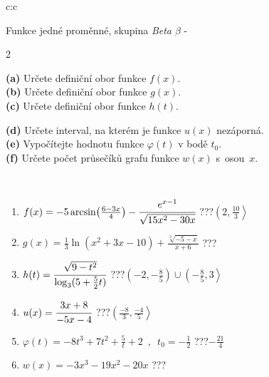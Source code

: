 \documentclass[10pt]{report}
\begin{document}
\begin{tabular}{c:c}
\begin{minipage}[c][104.5mm][t]{0.5\linewidth}
\begin{center}
\vspace{7mm}
{\huge Funkce jedné proměnné, skupina \textit{Beta $\beta$} -}\\[5mm]
\begin{minipage}{0.95\linewidth}
\begin{center}
{\small \begin{multicols}{2} \raggedright
\textbf{(a)} Určete definiční obor funkce \(f(x)\). \\[1mm]
\textbf{(b)} Určete definiční obor funkce \(g(x)\). \\[1mm]
\textbf{(c)} Určete definiční obor funkce \(h(t)\). \par \columnbreak
\textbf{(d)} Určete interval, na kterém je funkce \(u(x)\) nezáporná. \\[1mm]
\textbf{(e)} Vypočítejte hodnotu funkce \(\varphi(t)\) v bodě \(t_0\). \\[1mm]
\textbf{(f)} Určete počet průsečíků grafu funkce \(w(x)\) s~osou~\(x\). \\[1mm]
\end{multicols}
}
\end{center}
\end{minipage}
\\[4mm]
\begin{minipage}{0.79\linewidth}
\begin{center}
\begin{varwidth}{\linewidth}
\begin{enumerate}
\small
\item $f(x) = -5\arcsin\!\left( \frac{6-3x}{4} \right) - \cfrac{e^{x-1}}{\sqrt{15x^2-30x}}$\quad \dotfill\; ???\;\dotfill \quad $\left(2 , \frac{10}{3}\right\rangle$
\item $g(x) = \frac{1}{3} \ln{\!(x^2+3x-10)}+\frac{\sqrt[3]{-5-x}}{x+6}$\quad \dotfill\; ???\;\dotfill {}
\item $h(t) = \cfrac{\sqrt{9-t^2}}{\log_3(5+\frac{5}{2}t)}$\quad \dotfill\; ???\;\dotfill \quad $\left(-2 , -\frac{8}{5}\right)\cup\left(-\frac{8}{5} , 3\right\rangle$
\item $u(x) = \cfrac{3x+8}{-5x-4}$\quad \dotfill\; ???\;\dotfill \quad $\left(\frac{-8}{3} , \frac{-4}{5}\right\rangle$
\item $\varphi(t) = -8t^3+7t^2+\frac{5}{t}+2 \enspace , \enspace t_0=-\frac{1}{2}$\quad \dotfill\; ???\;\dotfill \quad $-\frac{21}{4}$
\item $w(x) = -3x^3-19x^2-20x$\quad \dotfill\; ???\;\dotfill {}

\end{enumerate}
\end{varwidth}
\end{center}
\end{minipage}
\end{center}
\end{minipage}
\end{tabular}
\end{document}

